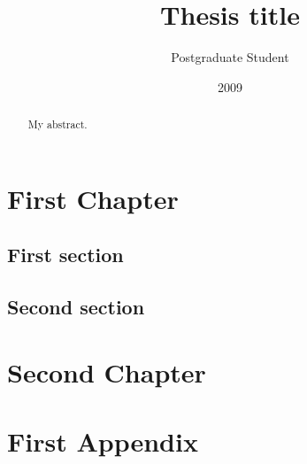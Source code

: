 \documentclass[10pt,twoside,openright]{report}
\title{Thesis title}
\author{Postgraduate Student}
\date{2009}
\begin{document}
\maketitle

\declaration

\dedication{To my ...}

\begin{abstract}
My abstract.
\end{abstract}

\tableofcontents

\chapter{First Chapter}

\section{First section}

\section{Second section}

\chapter{Second Chapter}

\appendix

\chapter{First Appendix}
\end{document}
